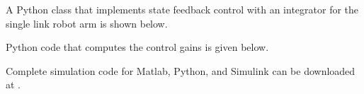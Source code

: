 A Python class that implements state feedback control with an integrator for the single link robot arm is shown below.


Python code that computes the control gains is given below.


Complete simulation code for Matlab, Python, and Simulink can be downloaded at .


%
%
%


